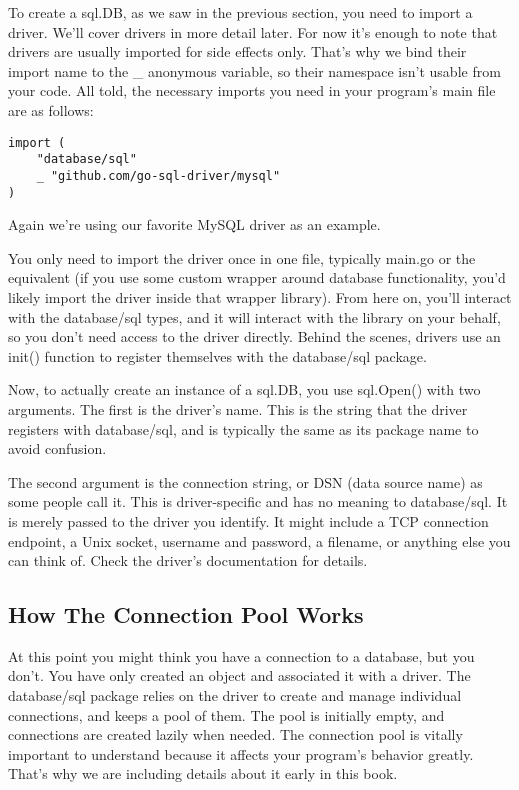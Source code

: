 \documentclass{vivid_layout}
\begin{document}
To create a sql.DB, as we saw in the previous section, you need to import a driver. We’ll cover drivers in more detail later. For now it’s enough to note that drivers are usually imported for side effects only. That’s why we bind their import name to the \_ anonymous variable, so their namespace isn’t usable from your code. All told, the necessary imports you need in your program’s main file are as follows:

\begin{verbatim}
import (
    "database/sql"
    _ "github.com/go-sql-driver/mysql"
)
\end{verbatim}

Again we’re using our favorite MySQL driver as an example.

You only need to import the driver once in one file, typically main.go or the equivalent (if you use some custom wrapper around database functionality, you’d likely import the driver inside that wrapper library). From here on, you’ll interact with the database/sql types, and it will interact with the library on your behalf, so you don’t need access to the driver directly. Behind the scenes, drivers use an init() function to register themselves with the database/sql package.

Now, to actually create an instance of a sql.DB, you use sql.Open() with two arguments. The first is the driver’s name. This is the string that the driver registers with database/sql, and is typically the same as its package name to avoid confusion.

The second argument is the connection string, or DSN (data source name) as some people call it. This is driver-specific and has no meaning to database/sql. It is merely passed to the driver you identify. It might include a TCP connection endpoint, a Unix socket, username and password, a filename, or anything else you can think of. Check the driver’s documentation for details.

\subsection{How The Connection Pool Works}

At this point you might think you have a connection to a database, but you don’t. You have only created an object and associated it with a driver. The database/sql package relies on the driver to create and manage individual connections, and keeps a pool of them. The pool is initially empty, and connections are created lazily when needed. The connection pool is vitally important to understand because it affects your program’s behavior greatly. That’s why we are including details about it early in this book.
\end{document}
